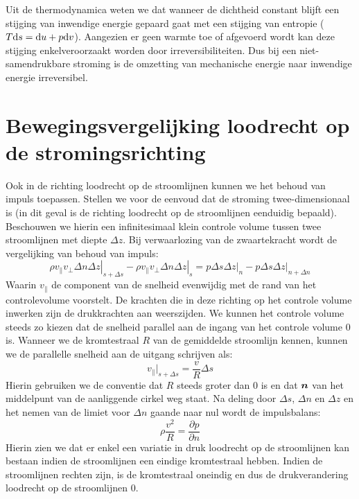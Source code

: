 Uit de thermodynamica weten we dat wanneer de dichtheid constant blijft een stijging van inwendige energie gepaard gaat met een stijging van entropie ($T\mathrm{d} s = \mathrm{d} u + p \mathrm{d} v$). Aangezien er geen warmte toe of afgevoerd wordt kan deze stijging enkelveroorzaakt worden door irreversibiliteiten. Dus bij een niet-samendrukbare stroming is de omzetting van mechanische energie naar inwendige energie irreversibel.

	\section{Bewegingsvergelijking loodrecht op de stromingsrichting}
Ook in de richting loodrecht op de stroomlijnen kunnen we het behoud van impuls toepassen. Stellen we voor de eenvoud dat de stroming twee-dimensionaal is (in dit geval is de richting loodrecht op de stroomlijnen eenduidig bepaald). Beschouwen we hierin een  infinitesimaal klein controle volume tussen twee stroomlijnen met diepte $\Delta z$. Bij verwaarlozing van de zwaartekracht wordt de vergelijking van behoud van impuls:
\begin{equation}
	\left.\rho v_{\parallel} v_{\perp} \Delta n \Delta z \right|_{s+\Delta s}-
	\left.\rho v_{\parallel} v_{\perp} \Delta n \Delta z \right|_{s} = 
	\left. p \Delta s \Delta z \right|_{n} - \left. p \Delta s \Delta z \right|_{n+\Delta n} 
\end{equation}
Waarin $v_{\parallel}$ de component van de snelheid evenwijdig met de rand van het controlevolume voorstelt.
De krachten die in deze richting op het controle volume inwerken zijn de drukkrachten aan weerszijden.
We kunnen het controle volume steeds zo kiezen dat de snelheid parallel aan de ingang van het controle volume $0$ is. Wanneer we de kromtestraal $R$ van de gemiddelde stroomlijn kennen, kunnen we de parallelle snelheid aan de uitgang schrijven als:
\begin{equation}
	v_{\parallel}|_{s+\Delta s} = \frac{v}{R} \Delta s
\end{equation}
Hierin gebruiken we de conventie dat $R$ steeds groter dan 0 is en dat $\boldsymbol{n}$ van het middelpunt van de aanliggende cirkel weg staat. Na deling door $\Delta s$,  $\Delta n$ en $\Delta z$ en het nemen van de limiet voor $\Delta n$ gaande naar nul wordt de impulsbalans:
\begin{equation}
	\rho \frac{v^2}{R} = \frac{\partial p}{\partial n}
\end{equation}
Hierin zien we dat er enkel een variatie in druk loodrecht op de stroomlijnen kan bestaan indien de stroomlijnen een eindige kromtestraal hebben. Indien de stroomlijnen rechten zijn, is de kromtestraal oneindig en dus de drukverandering loodrecht op de stroomlijnen $0$.
	
